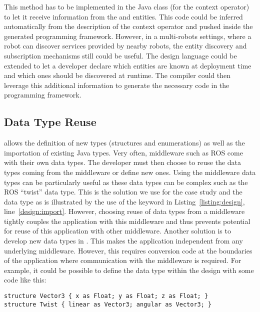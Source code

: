 This method has to be implemented in the  Java class (for
the  context operator) to let it receive information from
the  and  entities. This code could
be inferred automatically from the description of the 
context operator and pushed inside the generated programming
framework. However, in a multi-robots settings, where a robot can
discover services provided by nearby robots, the \diaspec{} entity
discovery and subscription mechanisms still could be useful. The
\diaspec{} design language could be extended to let a developer
declare which entities are known at deployment time and which ones
should be discovered at runtime. The compiler could then leverage this
additional information to generate the necessary code in the
programming framework.

\subsection{Data Type Reuse}

\diaspec{} allows the definition of new types (structures and
enumerations) as well as the importation of existing Java types. Very
often, middleware such as ROS come with their own data types. The
developer must then choose to reuse the data types coming from the
middleware or define new ones. Using the middleware data types can be
particularly useful as these data types can be complex such as the ROS
``twist'' data type. This is the solution we use for the case study
and the  data type as is illustrated by the use of the
 keyword in Listing~\ref{listing:design},
line~\ref{design:import}. However, choosing reuse of data types from a
middleware tightly couples the application with this middleware and
thus prevents potential for reuse of this application with other
middleware. Another solution is to develop new data types in
\diaspec{}. This makes the application independent from any underlying
middleware. However, this requires conversion code at the boundaries
of the application where communication with the middleware is
required. For example, it could be possible to define the 
data type within the design with some code like this:

\begin{lstlisting}[language=diaspec, numbers=none]
structure Vector3 { x as Float; y as Float; z as Float; }
structure Twist { linear as Vector3; angular as Vector3; }
\end{lstlisting}

